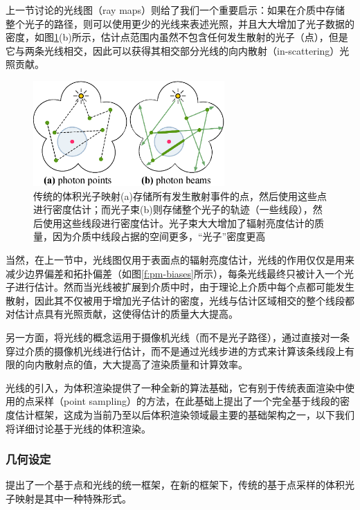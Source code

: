 上一节讨论的光线图（ray maps）则给了我们一个重要启示：如果在介质中存储整个光子的路径，则可以使用更少的光线来表述光照，并且大大增加了光子数据的密度，如图\ref{f:pm-points-vs-beams}(b)所示，估计点范围内虽然不包含任何发生散射的光子（点），但是它与两条光线相交，因此可以获得其相交部分光线的向内散射（in-scattering）光照贡献。

\begin{figure}
	\sidecaption
	\includegraphics[width=0.65\textwidth]{figures/pm/points-vs-beams}
	\caption{传统的体积光子映射(a)存储所有发生散射事件的点，然后使用这些点进行密度估计；而光子束(b)则存储整个光子的轨迹（一些线段），然后使用这些线段进行密度估计。光子束大大增加了辐射亮度估计的质量，因为介质中线段占据的空间更多，“光子”密度更高}
	\label{f:pm-points-vs-beams}
\end{figure}

当然，在上一节中，光线图仅用于表面点的辐射亮度估计，光线的作用仅仅是用来减少边界偏差和拓扑偏差（如图\ref{f:pm-biases}所示），每条光线最终只被计入一个光子进行估计。然而当光线被扩展到介质中时，由于理论上介质中每个点都可能发生散射，因此其不仅被用于增加光子估计的密度，光线与估计区域相交的整个线段都对估计点具有光照贡献，这使得估计的质量大大提高。

另一方面，\cite{a:TheBeamRadianceEstimateforVolumetricPhotonMapping}将光线的概念运用于摄像机光线（而不是光子路径），通过直接对一条穿过介质的摄像机光线进行估计，而不是通过光线步进的方式来计算该条线段上有限的向内散射点的值，大大提高了渲染质量和计算效率。

光线的引入，为体积渲染提供了一种全新的算法基础，它有别于传统表面渲染中使用的点采样（point sampling）的方法，\cite{a:AComprehensiveTheoryofVolumetricRadianceEstimationusingPhotonPointsandBeams}在此基础上提出了一个完全基于线段的密度估计框架，这成为当前乃至以后体积渲染领域最主要的基础架构之一，以下我们将详细讨论基于光线的体积渲染。





\subsubsection{几何设定}
\cite{a:AComprehensiveTheoryofVolumetricRadianceEstimationusingPhotonPointsandBeams}提出了一个基于点和光线的统一框架，在新的框架下，传统的基于点采样的体积光子映射是其中一种特殊形式。

